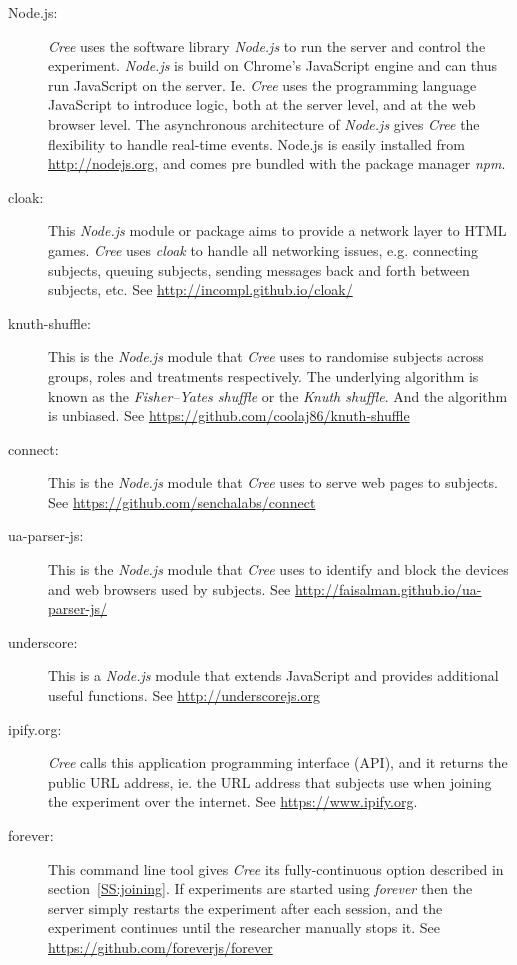 \documentclass[preprint, 12pt]{elsarticle}
\newcommand{\Cree}{\emph{Cree}\xspace}
\begin{document}
\begin{description}
  \item[Node.js:] \Cree uses the software library \emph{Node.js} to run the server and control the experiment. \emph{Node.js} is build on Chrome's JavaScript engine and can thus run JavaScript on the server. Ie. \Cree uses the programming language JavaScript to introduce logic, both at the server level, and at the web browser level. The asynchronous architecture of \emph{Node.js} gives \Cree the flexibility to handle real-time events. Node.js is easily installed from \url{http://nodejs.org}, and comes pre bundled with the package manager \emph{npm}.
  \item[cloak:] This \emph{Node.js} module or package aims to provide a network layer to HTML games. \Cree uses \emph{cloak} to handle all networking issues, e.g. connecting subjects, queuing subjects, sending messages back and forth between subjects, etc. See \url{http://incompl.github.io/cloak/}
  \item[knuth-shuffle:] This is the \emph{Node.js} module that \Cree uses to randomise subjects across groups, roles and treatments respectively. The underlying algorithm is known as the \emph{Fisher–Yates shuffle} or the \emph{Knuth shuffle}. And the algorithm is unbiased. See \url{https://github.com/coolaj86/knuth-shuffle}
  \item[connect:] This is the \emph{Node.js} module that \Cree uses to serve web pages to subjects. See \url{https://github.com/senchalabs/connect}
  \item[ua-parser-js:] This is the \emph{Node.js} module that \Cree uses to identify and block the devices and web browsers used by subjects. See \url{http://faisalman.github.io/ua-parser-js/}
  \item[underscore:] This is a \emph{Node.js} module that extends JavaScript and provides additional useful functions. See \url{http://underscorejs.org}
  \item[ipify.org:] \Cree calls this application programming interface (API), and it returns the public URL address, ie. the URL address that subjects use when joining the experiment over the internet. See \url{https://www.ipify.org}.
  \item[forever:] This command line tool gives \Cree its fully-continuous option described in section~\ref{SS:joining}. If experiments are started using \emph{forever} then the server simply restarts the experiment after each session, and the experiment continues until the researcher manually stops it. See \url{https://github.com/foreverjs/forever}

\end{description}
\end{document}
